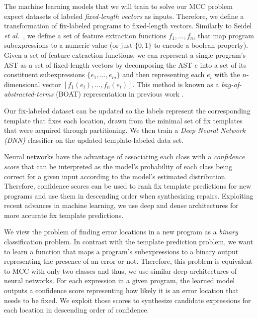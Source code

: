  The machine learning models that we will train to
solve our MCC problem expect datasets of labeled \emph{fixed-length vectors} as
inputs. Therefore, we define a transformation of fix-labeled programs to
fixed-length vectors. Similarly to Seidel \emph{et al.}~\citep{Seidel:2017}, we
define a set of feature extraction functions $f_1, \ldots, f_n$, that map
program subexpressions to a numeric value (or just $\{0, 1\}$ to encode a
boolean property). Given a set of feature extraction functions, we can represent
a single program's AST as a set of fixed-length vectors by decomposing the AST
$e$ into a set of its constituent subexpressions $\{e_1, \ldots, e_m\}$ and then
representing each $e_i$ with the $n$-dimensional vector $[f_1(e_i), \ldots,
f_n(e_i)]$. This method is known as a \emph{bag-of-abstracted-terms} (BOAT)
representation in previous work \citep{Seidel:2017}.

Our fix-labeled dataset can be updated so the labels represent the corresponding
template that fixes each location, drawn from the minimal set of fix templates
that were acquired through partitioning. We then train a \emph{Deep Neural
Network (DNN)} classifier on the updated template-labeled data set.

Neural networks have the advantage of associating each class with a
\emph{confidence score} that can be interpreted as the model's probability of
each class being correct for a given input according to the model's estimated
distribution. Therefore, confidence scores can be used to rank fix template
predictions for new programs and use them in descending order when synthesizing
repairs. Exploiting recent advances in machine learning, we use deep and dense
architectures \citep{Schmidhuber_2015} for more accurate fix template
predictions.

 We view the problem of finding error locations in a
new program as a \emph{binary} classification problem. In contrast with the
template prediction problem, we want to learn a function that maps a program's
subexpressions to a binary output representing the presence of an error or not.
Therefore, this problem is equivalent to MCC with only two classes and thus, we
use similar deep architectures of neural networks. For each expression in a
given program, the learned model outputs a confidence score representing how
likely it is an error location that needs to be fixed. We exploit those scores
to synthesize candidate expressions for each location in descending order of
confidence.

